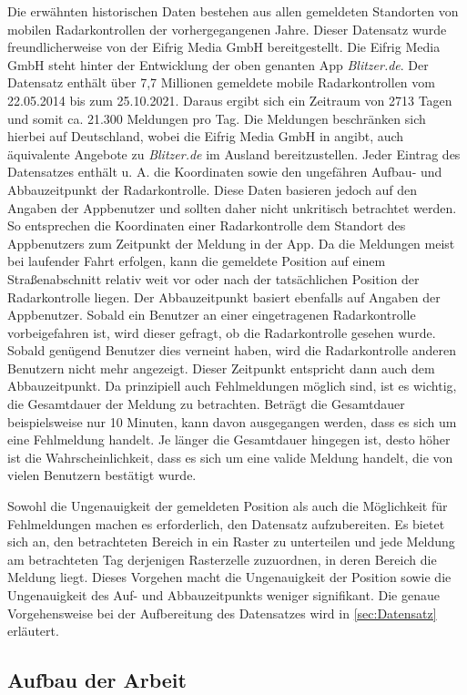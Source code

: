 Die erwähnten historischen Daten bestehen aus allen gemeldeten Standorten von mobilen Radarkontrollen der vorhergegangenen Jahre.
Dieser Datensatz wurde freundlicherweise von der Eifrig Media GmbH bereitgestellt.
Die Eifrig Media GmbH steht hinter der Entwicklung der oben genanten App \emph{Blitzer.de}.
Der Datensatz enthält über 7,7 Millionen gemeldete mobile Radarkontrollen vom 22.05.2014 bis zum 25.10.2021.
Daraus ergibt sich ein Zeitraum von 2713 Tagen und somit ca. 21.300 Meldungen pro Tag.
Die Meldungen beschränken sich hierbei auf Deutschland, wobei die Eifrig Media GmbH in \cite{AboutBlitzerDe} angibt, auch äquivalente Angebote zu \emph{Blitzer.de} im Ausland bereitzustellen.
Jeder Eintrag des Datensatzes enthält u. A. die Koordinaten sowie den ungefähren Aufbau- und Abbauzeitpunkt der Radarkontrolle.
Diese Daten basieren jedoch auf den Angaben der Appbenutzer und sollten daher nicht unkritisch betrachtet werden.
So entsprechen die Koordinaten einer Radarkontrolle dem Standort des Appbenutzers zum Zeitpunkt der Meldung in der App.
Da die Meldungen meist bei laufender Fahrt erfolgen, kann die gemeldete Position auf einem Straßenabschnitt relativ weit vor oder nach der tatsächlichen Position der Radarkontrolle liegen.
Der Abbauzeitpunkt basiert ebenfalls auf Angaben der Appbenutzer.
Sobald ein Benutzer an einer eingetragenen Radarkontrolle vorbeigefahren ist, wird dieser gefragt, ob die Radarkontrolle gesehen wurde.
Sobald genügend Benutzer dies verneint haben, wird die Radarkontrolle anderen Benutzern nicht mehr angezeigt.
Dieser Zeitpunkt entspricht dann auch dem Abbauzeitpunkt.
Da prinzipiell auch Fehlmeldungen möglich sind, ist es wichtig, die Gesamtdauer der Meldung zu betrachten.
Beträgt die Gesamtdauer beispielsweise nur 10 Minuten, kann davon ausgegangen werden, dass es sich um eine Fehlmeldung handelt.
Je länger die Gesamtdauer hingegen ist, desto höher ist die Wahrscheinlichkeit, dass es sich um eine valide Meldung handelt, die von vielen Benutzern bestätigt wurde.

Sowohl die Ungenauigkeit der gemeldeten Position als auch die Möglichkeit für Fehlmeldungen machen es erforderlich, den Datensatz aufzubereiten.
Es bietet sich an, den betrachteten Bereich in ein Raster zu unterteilen und jede Meldung am betrachteten Tag derjenigen Rasterzelle zuzuordnen, in deren Bereich die Meldung liegt.
Dieses Vorgehen macht die Ungenauigkeit der Position sowie die Ungenauigkeit des Auf- und Abbauzeitpunkts weniger signifikant.
Die genaue Vorgehensweise bei der Aufbereitung des Datensatzes wird in \autoref{sec:Datensatz} erläutert.

\subsection{Aufbau der Arbeit}
\label{sec:Aufbau}


